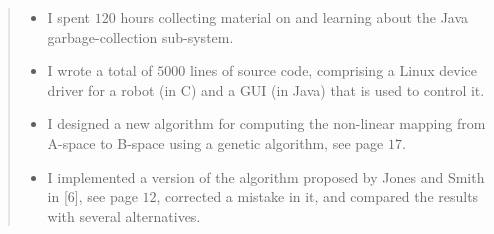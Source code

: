 \begin{quote}
\noindent
\begin{itemize}
\item I spent $120$ hours collecting material on and learning about the 
      Java garbage-collection sub-system. 
\item I wrote a total of $5000$ lines of source code, comprising a Linux 
      device driver for a robot (in C) and a GUI (in Java) that is 
      used to control it.
\item I designed a new algorithm for computing the non-linear mapping 
      from A-space to B-space using a genetic algorithm, see page $17$.
\item I implemented a version of the algorithm proposed by Jones and 
      Smith in [6], see page $12$, corrected a mistake in it, and 
      compared the results with several alternatives.
\end{itemize}
\end{quote}

